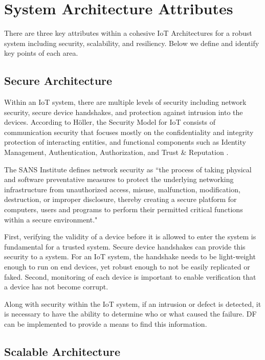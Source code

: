 \documentclass[../main.tex]{subfiles}
\begin{document}
\section{System Architecture Attributes}

There are three key attributes within a cohesive IoT Architectures for a robust system including security, scalability, and resiliency. Below we define and identify key points of each area. 

\subsection{Secure Architecture}
Within an IoT system, there are multiple levels of security including network security, secure device handshakes, and protection against intrusion into the devices. According to H\"oller, the Security Model for IoT consists of communication security that focuses mostly on the confidentiality and integrity protection of interacting entities, and functional components such as Identity Management, Authentication, Authorization, and Trust \& Reputation \cite{m2m_iot}.

The SANS Institute defines network security as “the process of taking physical and software preventative measures to protect the underlying networking infrastructure from unauthorized access, misuse, malfunction, modification, destruction, or improper disclosure, thereby creating a secure platform for computers, users and programs to perform their permitted critical functions within a secure environment." \cite{network_sans}

First, verifying the validity of a device before it is allowed to enter the system is fundamental for a trusted system. Secure device handshakes can provide this security to a system. For an IoT system, the handshake needs to be light-weight enough to run on end devices, yet robust enough to not be easily replicated or faked. Second, monitoring of each device is important to enable verification that a device has not become corrupt.

Along with security within the IoT system, if an intrusion or defect is detected, it is necessary to have the ability to determine who or what caused the failure. DF can be implemented to provide a means to find this information. 

\subsection{Scalable Architecture}
\end{document}
